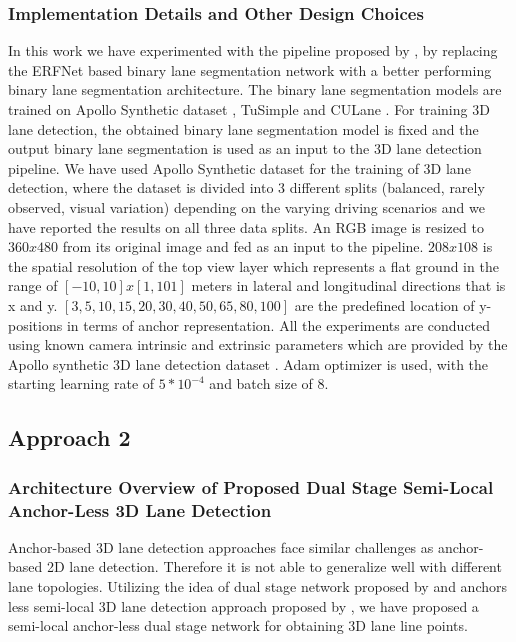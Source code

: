             \subsubsection{Implementation Details and Other Design Choices}
            In this work we have experimented with the pipeline proposed by \cite{Guo_2018_ECCV}, by replacing the ERFNet\cite{Romera2018ERFNetER} based binary lane segmentation network with a better performing binary lane segmentation architecture. The binary lane segmentation models are trained on Apollo Synthetic dataset \cite{guo2020gen}, TuSimple \cite{Tusimple} and CULane \cite{pan2018SCNN}. For training 3D lane detection, the obtained binary lane segmentation model is fixed and the output binary lane segmentation is used as an input to the 3D lane detection pipeline. We have used Apollo Synthetic dataset \cite{Guo_2018_ECCV} for the training of 3D lane detection, where the dataset is divided into 3 different splits (balanced, rarely observed, visual variation) depending on the varying driving scenarios and we have reported the results on all three data splits. An RGB image is resized to $360 x 480$ from its original image and fed as an input to the pipeline. $208 x 108$ is the spatial resolution of the top view layer which represents a flat ground in the range of $[-10, 10] x [1 , 101]$ meters in lateral and longitudinal directions that is x and y. $[3, 5, 10, 15, 20, 30, 40, 50, 65, 80, 100]$ are the predefined location of y-positions in terms of anchor representation. All the experiments are conducted using known camera intrinsic and extrinsic parameters which are provided by the Apollo synthetic 3D lane detection dataset \cite{guo2020gen}. Adam optimizer is used, with the starting learning rate of $5*10^{-4}$ and batch size of 8. 
            
        \subsection{Approach 2}
        
        \subsubsection{Architecture Overview of Proposed Dual Stage Semi-Local Anchor-Less 3D Lane Detection}
        
        Anchor-based 3D lane detection approaches face similar challenges as anchor-based 2D lane detection. Therefore it is not able to generalize well with different lane topologies. Utilizing the idea of dual stage network proposed by \cite{guo2020gen} and anchors less semi-local 3D lane detection approach proposed by \cite{DBLP:journals/corr/abs-2011-01535}, we have proposed a semi-local anchor-less dual stage network for obtaining 3D lane line points.
        
